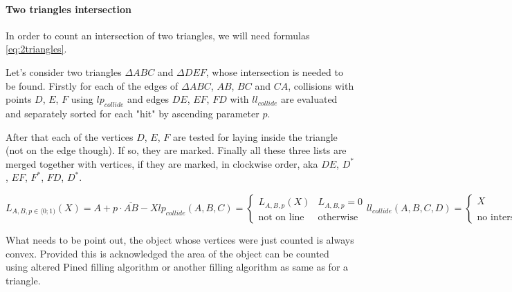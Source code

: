 \paragraph{Two triangles intersection}
In order to count an intersection of two triangles, we will need formulas \ref{eq:2triangles}.

Let's consider two triangles $\Delta ABC$ and $\Delta DEF$, whose intersection is needed
to be found. Firstly for each of the edges of $\Delta ABC$, $AB$, $BC$ and $CA$,
collisions with points $D$, $E$, $F$ using $lp_{collide}$ and edges $DE$, $EF$, $FD$
with $ll_{collide}$ are evaluated and separately sorted for each "hit" by ascending
parameter $p$.

After that each of the vertices $D$, $E$, $F$ are tested for laying inside the triangle
(not on the edge though). If so, they are marked. Finally all these three lists are
merged together with vertices, if they are marked, in clockwise order, aka $DE$, $D^{*}$,
$EF$, $F^{*}$, $FD$, $D^{*}$.

\begin{subequations}

\begin{equation}
L_{A,B,p \in \langle 0;1)}(X) = A + p\cdot\overline{AB} - X
\end{equation}

\begin{equation}
lp_{collide}(A,B,C) = \begin{cases} L_{A,B,p}(X)       & L_{A,B,p} = 0 \\
                                    \text{not~on~line} & \text{otherwise}
                        \end{cases}
\end{equation}

\begin{equation}
ll_{collide}(A,B,C,D) = \begin{cases} X                       & lp_{A,B,X} \land L_{C,D,X} \\
                                      \text{no~intersection}  & \text{otherwise}
                        \end{cases}
\end{equation}

\label{eq:2triangles}
\end{subequations}

What needs to be point out, the object whose vertices were just counted is always convex.
Provided this is acknowledged the area of the object can be counted using altered 
Pined filling algorithm or another filling algorithm as same as for a triangle.

